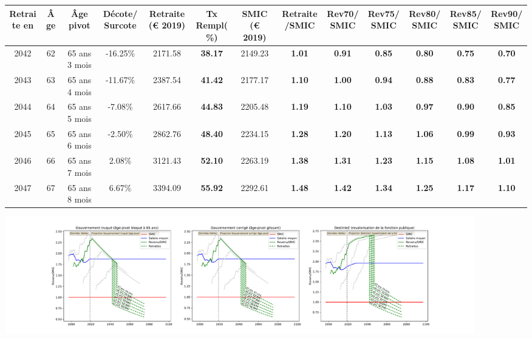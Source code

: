 { \scriptsize \begin{center} 
\begin{tabular}[htb]{|c|c||c|c||c|c||c||c|c|c|c|c|c|} 
\hline 
 Retraite en &  Âge &  Âge pivot &  Décote/Surcote &  Retraite (\euro{} 2019) &  Tx Rempl(\%) &  SMIC (\euro{} 2019) &  Retraite/SMIC &  Rev70/SMIC &  Rev75/SMIC &  Rev80/SMIC &  Rev85/SMIC &  Rev90/SMIC \\ 
\hline \hline 
 2042 &  62 &  65 ans 3 mois &  -16.25\% &  2171.58 &  {\bf 38.17} &  2149.23 &  {\bf 1.01} &  {\bf {\color{red} 0.91}} &  {\bf {\color{red} 0.85}} &  {\bf {\color{red} 0.80}} &  {\bf {\color{red} 0.75}} &  {\bf {\color{red} 0.70}} \\ 
\hline 
 2043 &  63 &  65 ans 4 mois &  -11.67\% &  2387.54 &  {\bf 41.42} &  2177.17 &  {\bf 1.10} &  {\bf 1.00} &  {\bf {\color{red} 0.94}} &  {\bf {\color{red} 0.88}} &  {\bf {\color{red} 0.83}} &  {\bf {\color{red} 0.77}} \\ 
\hline 
 2044 &  64 &  65 ans 5 mois &  -7.08\% &  2617.66 &  {\bf 44.83} &  2205.48 &  {\bf 1.19} &  {\bf 1.10} &  {\bf 1.03} &  {\bf {\color{red} 0.97}} &  {\bf {\color{red} 0.90}} &  {\bf {\color{red} 0.85}} \\ 
\hline 
 2045 &  65 &  65 ans 6 mois &  -2.50\% &  2862.76 &  {\bf 48.40} &  2234.15 &  {\bf 1.28} &  {\bf 1.20} &  {\bf 1.13} &  {\bf 1.06} &  {\bf {\color{red} 0.99}} &  {\bf {\color{red} 0.93}} \\ 
\hline 
 2046 &  66 &  65 ans 7 mois &  2.08\% &  3121.43 &  {\bf 52.10} &  2263.19 &  {\bf 1.38} &  {\bf 1.31} &  {\bf 1.23} &  {\bf 1.15} &  {\bf 1.08} &  {\bf 1.01} \\ 
\hline 
 2047 &  67 &  65 ans 8 mois &  6.67\% &  3394.09 &  {\bf 55.92} &  2292.61 &  {\bf 1.48} &  {\bf 1.42} &  {\bf 1.34} &  {\bf 1.25} &  {\bf 1.17} &  {\bf 1.10} \\ 
\hline 
\hline 
\end{tabular} 
\end{center} } 

 \begin{center}\includegraphics[width=0.9\textwidth]{fig/ProfEcoles_1980_22_dest_retraite.pdf}\end{center} \label{fig/ProfEcoles_1980_22_dest_retraite.pdf} 

